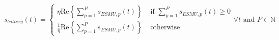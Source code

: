\begin{equation}
	s_{battery}(t) = 
	\begin{cases}
		\eta\text{Re}\left\{\sum_{p=1}^{P}s_{ESMU,p}(t)\right\} &\text{ if } \sum_{p=1}^{P}s_{ESMU,p}(t) \geq 0\\
		\frac{1}{\eta}\text{Re}\left\{\sum_{p=1}^{P}s_{ESMU,p}(t)\right\} &\text{ otherwise}
	\end{cases} \forall t \text{ and } P \in \mathbb{N}
	\label{ch1:equ:battery-power-definition}
\end{equation}